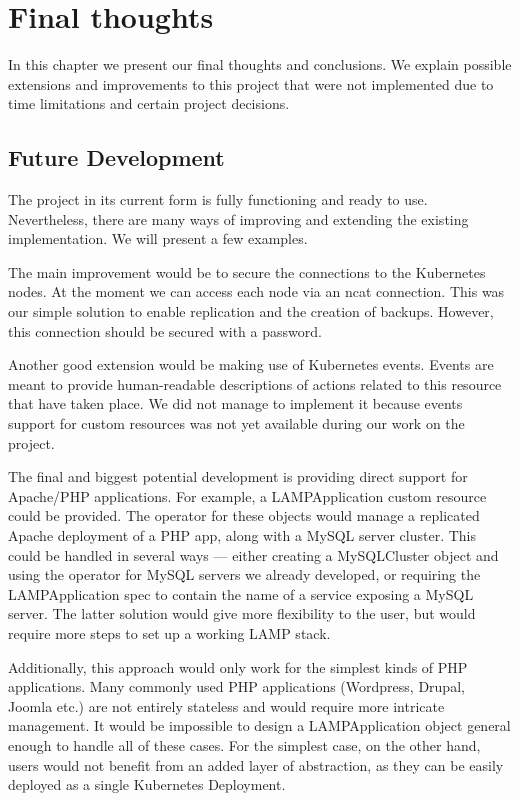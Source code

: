 \chapter{Final thoughts}
In this chapter we present our final thoughts and conclusions. We explain possible extensions
and improvements to this project that were not implemented due to time limitations and certain
project decisions.

\section{Future Development}
The project in its current form is fully functioning and ready to use. Nevertheless, there are many
ways of improving and extending the existing implementation. We will present a few examples.

The main improvement would be to secure the connections to the Kubernetes nodes. At the moment we
can access each node via an ncat connection. This was our simple solution to enable replication and
the creation of backups. However, this connection should be secured with a password.

Another good extension would be making use of Kubernetes events. Events are meant to provide
human-readable descriptions of actions related to this resource that have taken place. We did not
manage to implement it because events support for custom resources was not yet available during our
work on the project.

The final and biggest potential development is providing direct support for Apache/PHP applications.
For example, a LAMPApplication custom resource could be provided. The operator for these objects
would manage a replicated Apache deployment of a PHP app, along with a MySQL server cluster.
This could be handled in several ways --- either creating a MySQLCluster object and using the
operator for MySQL servers we already developed, or requiring the LAMPApplication spec to contain
the name of a service exposing a MySQL server. The latter solution would give more flexibility to
the user, but would require more steps to set up a working LAMP stack.

Additionally, this approach would only work for the simplest kinds of PHP applications.
Many commonly used PHP applications (Wordpress, Drupal, Joomla etc.) are not entirely stateless and
would require more intricate management. It would be impossible to design a LAMPApplication object
general enough to handle all of these cases. For the simplest case, on the other
hand, users would not benefit from an added layer of abstraction, as they can be easily deployed as a single
Kubernetes Deployment.

